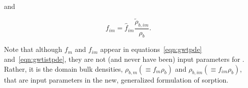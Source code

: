 \noindent and 

\begin{equation}
\label{eqn:fimfim}
f_{im} = \hat{f}_{im} \frac{\tilde{\rho}_{b, im}}{\rho_{b}}.
\end{equation}

\noindent Note that although $f_{m}$ and $f_{im}$ appear in equations~\ref{eqn:gwtpde} and~\ref{eqn:gwtistpde}, they are not (and never have been) input parameters for \mf. Rather, it is the domain bulk densities, $\rho_{b, m} \left ( \equiv f_{m} \rho_b \right )$ and $\rho_{b, im} \left ( \equiv f_{im} \rho_b \right )$, that are input parameters in the new, generalized formulation of sorption.
